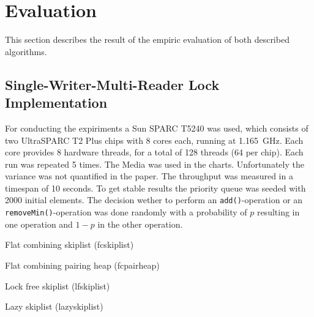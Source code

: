 
\section{Evaluation}

This section describes the result of the empiric evaluation of both described algorithms.

\subsection{Single-Writer-Multi-Reader Lock Implementation}

For conducting the expiriments a Sun SPARC T5240 was used, which consists of two UltraSPARC T2 Plus chips with 8 cores each, running at 1.165~GHz. Each core provides 8 hardware threads, for a total of 128 threads (64 per chip). Each run was repeated 5 times. The Media was used in the charts. Unfortunately the variance was not quantified in the paper. The throughput was measured in a timespan of 10 seconds. To get stable results the priority queue was seeded with 2000 initial elements. The decision wether to perform an \texttt{add()}-operation or an \texttt{removeMin()}-operation was done randomly with a probability of $p$ resulting in one operation and $1-p$ in the other operation.

Flat combining skiplist (fcskiplist) \cite{hendler_flat_2010}

Flat combining pairing heap (fcpairheap) \cite{hendler_flat_2010}

Lock free skiplist (lfskiplist) \cite{sundell_fast_2003}

Lazy skiplist (lazyskiplist) \cite{lotan_skiplist-based_2000}


